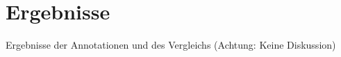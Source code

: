 \chapter{Ergebnisse}
\label{chap:Ergebnisse}
\pagestyle{plain}

Ergebnisse der Annotationen und des Vergleichs (Achtung: Keine Diskussion)